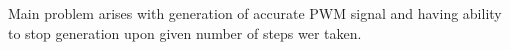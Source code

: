 Main problem arises with generation of accurate PWM signal and having ability to stop generation upon given number of steps wer taken.






\listoffigures

\listoftables

\clearpage
\openright


